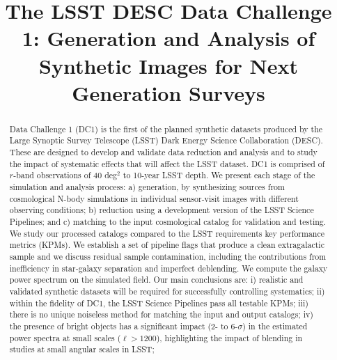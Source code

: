 \documentclass[\docopts]{\docclass}
\begin{document}
\title[LSST DESC DC1]{The LSST DESC Data Challenge 1: Generation and Analysis of Synthetic Images for Next Generation Surveys }
%
\maketitlepre

\begin{abstract}
  Data Challenge 1 (DC1) is the first of the planned synthetic
  datasets produced by the Large Synoptic Survey Telescope (LSST)
  Dark Energy Science Collaboration (DESC). These are designed to
  develop and validate data reduction and analysis
  and to study the impact of systematic effects that
  will affect the LSST dataset. DC1 is comprised of $r$-band
  observations of 40 deg$^{2}$ to 10-year LSST depth. We present
  each stage of the simulation and analysis process: a) generation, by synthesizing sources from cosmological
  N-body simulations in individual sensor-visit images with different observing conditions; b)
  reduction using a development version of the
  LSST Science Pipelines; and c) matching to the input cosmological catalog for validation and testing. We
  study our processed catalogs compared to the
  LSST requirements key performance metrics (KPMs). We establish a
  set of pipeline flags that produce a clean extragalactic sample and
  we discuss residual sample contamination, including the contributions from 
  inefficiency in star-galaxy separation and imperfect deblending. We compute the galaxy power spectrum on the simulated field. Our main
  conclusions are: i) realistic and validated synthetic datasets will
  be required for successfully controlling systematics; ii) within the fidelity of DC1,
   the LSST Science Pipelines pass all testable KPMs;
   iii) there is no unique noiseless method for matching the input and output
  catalogs; iv) the presence of bright objects has a significant
  impact (2- to 6-$\sigma$) in the estimated power spectra at small scales ($\ell > 1200$),
  highlighting the impact of blending in studies at small angular scales in LSST; 
  


\end{abstract}
\end{document}
